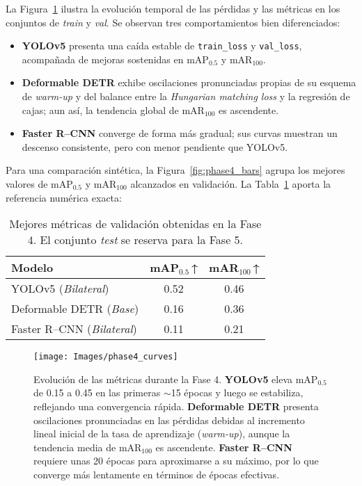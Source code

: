 La Figura~\ref{fig:phase4_curves} ilustra la evolución temporal de las pérdidas y las métricas en los conjuntos de \textit{train} y \textit{val}.
Se observan tres comportamientos bien diferenciados:

\begin{itemize}
  \item \textbf{YOLOv5} presenta una caída estable de \texttt{train\_loss} y \texttt{val\_loss}, acompañada de mejoras sostenidas en mAP\(_{0.5}\) y mAR\(_{100}\).
  \item \textbf{Deformable DETR} exhibe oscilaciones pronunciadas propias de su esquema de \emph{warm-up} y del balance entre la \emph{Hungarian matching loss} y la regresión de cajas; aun así, la tendencia global de mAR\(_{100}\) es ascendente.
  \item \textbf{Faster R–CNN} converge de forma más gradual; sus curvas muestran un descenso consistente, pero con menor pendiente que YOLOv5.
\end{itemize}

Para una comparación sintética, la Figura~\ref{fig:phase4_bars} agrupa los mejores valores de mAP\(_{0.5}\) y mAR\(_{100}\) alcanzados en validación.
La Tabla~\ref{tab:phase4_val} aporta la referencia numérica exacta:

\begin{table}[htpb]
  \centering
  \caption{Mejores métricas de validación obtenidas en la Fase 4.
           El conjunto \textit{test} se reserva para la Fase 5.}
  \label{tab:phase4_val}
  \begin{tabular}{lcc}
    \hline
    Modelo & mAP\(_{0.5}\)\,↑ & mAR\(_{100}\)\,↑\\
    \hline
    YOLOv5 (\textit{Bilateral})        & 0.52 & 0.46\\
    Deformable DETR (\textit{Base})    & 0.16 & 0.36\\
    Faster R--CNN (\textit{Bilateral}) & 0.11 & 0.21\\
    \hline
  \end{tabular}
\end{table}

\begin{figure}[htpb]
  \centering
  \texttt{[image: Images/phase4\_curves]}
  \caption[Evolución de las métricas durante la Fase 4 (resumen)]%
          {Evolución de las métricas durante la Fase 4.%
          \textbf{YOLOv5} eleva mAP\(_{0.5}\) de 0.15 a 0.45 en las primeras \(\sim\)15 épocas y luego se estabiliza, reflejando una convergencia rápida.%
          \textbf{Deformable DETR} presenta oscilaciones pronunciadas en las pérdidas debidas al incremento lineal inicial de la tasa de aprendizaje (\emph{warm-up})\footnotemark, aunque la tendencia media de mAR\(_{100}\) es ascendente.%
          \textbf{Faster R--CNN} requiere unas 20 épocas para aproximarse a su máximo, por lo que converge más lentamente en términos de épocas efectivas.}%
  \label{fig:phase4_curves}
\end{figure}


